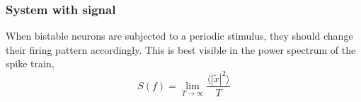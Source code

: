 \documentclass[12pt,a4paper]{article}
\begin{document}
\subsubsection{System with signal}
When bistable neurons are subjected to a periodic stimulus, they should change their firing pattern accordingly. This is best visible in the power spectrum of the spike train, 
\begin{equation}
S(f)=\lim_{T\rightarrow\infty}\frac{\langle|\tilde{x}|^2\rangle}{T}
\end{equation}
\end{document}
